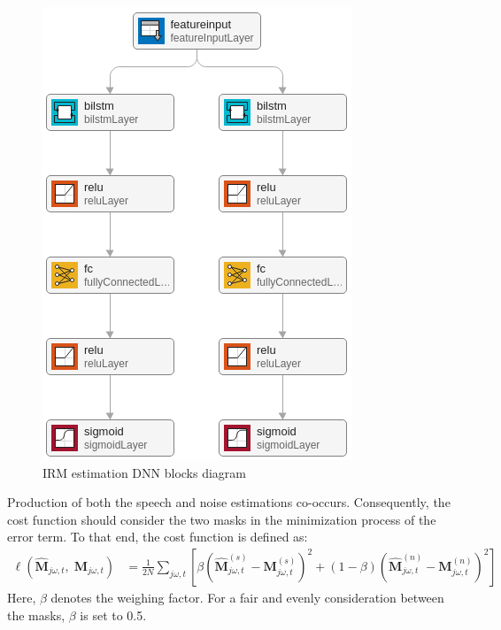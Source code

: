 \begin{figure}[H]
    \centering
    \includegraphics[width=0.95\linewidth]{Features/images/irm_dnn}
    \caption{IRM estimation DNN blocks diagram}\label{fig:irm_dnn}
\end{figure}

Production of both the speech and noise estimations co-occurs. 
Consequently, the cost function should 
consider the two masks in the 
minimization process of the error term.
To that end, the cost function is defined as:
\begin{align}
    \ell(\mathbf{\widehat{M}}_{j\omega, t},\;\mathbf{M}_{j\omega, t}) & = 
        \frac{1}{2N}\sum_{j\omega, t}
        \left[ 
            \beta\!\left( 
                \mathbf{\widehat{M}}^{(s)}_{j\omega, t} - 
                \mathbf{M}^{(s)}_{j\omega, t} 
            \right)^{2} 
            + \left( 1- \beta \right)\!
            \left(
                \mathbf{\widehat{M}}^{(n)}_{j\omega, t} - 
                \mathbf{M}^{(n)}_{j\omega, t} 
            \right)^{2} 
        \right]
\end{align}
Here, \(\beta\) denotes the weighing factor.
For a fair and evenly consideration between the masks, \(\beta \)
is set to 0.5.


